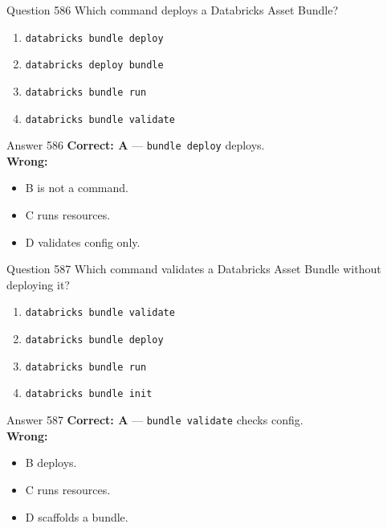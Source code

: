 \documentclass[aspectratio=169,11pt]{beamer}
\begin{document}
	\begin{frame}{Question 586}
		Which command deploys a Databricks Asset Bundle?
		\begin{enumerate}[label=\Alph*.]
			\item \texttt{databricks bundle deploy}
			\item \texttt{databricks deploy bundle}
			\item \texttt{databricks bundle run}
			\item \texttt{databricks bundle validate}
		\end{enumerate}
	\end{frame}
	\begin{frame}{Answer 586}
		\textbf{Correct: A} --- \texttt{bundle deploy} deploys.\\
		\vspace{0.5em}
		\textbf{Wrong:}
		\begin{itemize}
			\item B is not a command.
			\item C runs resources.
			\item D validates config only.
		\end{itemize}
	\end{frame}
	
	\begin{frame}{Question 587}
		Which command validates a Databricks Asset Bundle without deploying it?
		\begin{enumerate}[label=\Alph*.]
			\item \texttt{databricks bundle validate}
			\item \texttt{databricks bundle deploy}
			\item \texttt{databricks bundle run}
			\item \texttt{databricks bundle init}
		\end{enumerate}
	\end{frame}
	\begin{frame}{Answer 587}
		\textbf{Correct: A} --- \texttt{bundle validate} checks config.\\
		\vspace{0.5em}
		\textbf{Wrong:}
		\begin{itemize}
			\item B deploys.
			\item C runs resources.
			\item D scaffolds a bundle.
		\end{itemize}
	\end{frame}
	
\end{document}
